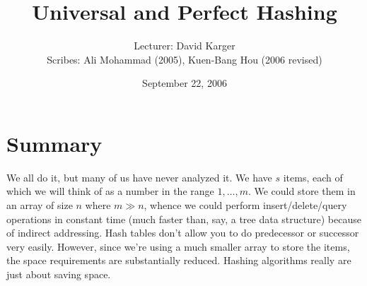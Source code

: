 \documentclass{article}
\begin{document}
\newcommand{\mod}{\hbox{mod }}

\title{Universal and Perfect Hashing}
\date{September 22, 2006}
\author{Lecturer: David Karger\\ Scribes: Ali Mohammad (2005), Kuen-Bang Hou (2006 revised)}


%
%
%
%

%



\section{Summary}

We all do it, but many of us have never analyzed it.  We have $s$ items,
each of which we will think of as a number in the range $1, \ldots, m$.
We could store them in an array of size $n$ where $m \gg n$, whence we could perform
insert/delete/query operations in constant time (much faster than, say,
a tree data structure) because of indirect addressing.  Hash tables don't
allow you to do predecessor or successor very easily.  However, since
we're using a much smaller array to store the items, the space requirements
are substantially reduced.  Hashing algorithms really are just about saving space.
\end{document}
